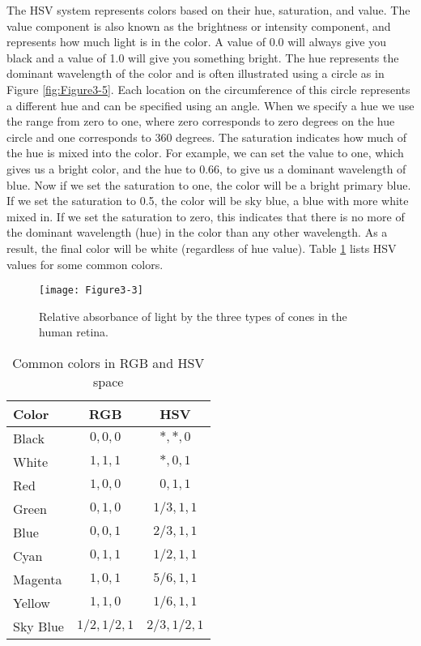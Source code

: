 The HSV system represents colors based on their hue, saturation, and value. The value component is also known as the brightness or intensity component, and represents how much light is in the color. A value of 0.0 will always give you black and a value of 1.0 will give you something bright. The hue represents the dominant wavelength of the color and is often illustrated using a circle as in Figure \ref{fig:Figure3-5}. Each location on the circumference of this circle represents a different hue and can be specified using an angle. When we specify a hue we use the range from zero to one, where zero corresponds to zero degrees on the hue circle and one corresponds to 360 degrees. The saturation indicates how much of the hue is mixed into the color. For example, we can set the value to one, which gives us a bright color, and the hue to 0.66, to give us a dominant wavelength of blue. Now if we set the saturation to one, the color will be a bright primary blue. If we set the saturation to 0.5, the color will be sky blue, a blue with more white mixed in. If we set the saturation to zero, this indicates that there is no more of the dominant wavelength (hue) in the color than any other wavelength. As a result, the final color will be white (regardless of hue value). Table \ref{table:Figure3-4} lists HSV values for some common colors.

\begin{figure}[!htb]
  \centering
  \texttt{[image: Figure3-3]}\\
  \caption{Relative absorbance of light by the three types of cones in the human retina.}\label{fig:Figure3-3}
\end{figure}

\begin{table}
	\centering
    \begin{tabular}{ | l | c | c | }
    \hline
    Color & RGB & HSV\\
    \hline
    Black & $0,0,0$ & $\ast,\ast,0$\\
    White & $1,1,1$ & $\ast,0,1$\\
    Red & $1,0,0$ & $0,1,1$\\
    Green & $0,1,0$ & $1/3,1,1$\\
    Blue & $0,0,1$ & $2/3,1,1$\\
    Cyan & $0,1,1$ & $1/2,1,1$\\
    Magenta & $1,0,1$ & $5/6,1,1$\\
    Yellow & $1,1,0$ & $1/6,1,1$\\
    Sky Blue & $1/2,1/2,1$ & $2/3,1/2,1$\\
    \hline
    \end{tabular}
    \caption{Common colors in RGB and HSV space}\label{table:Figure3-4}
\end{table}
  
